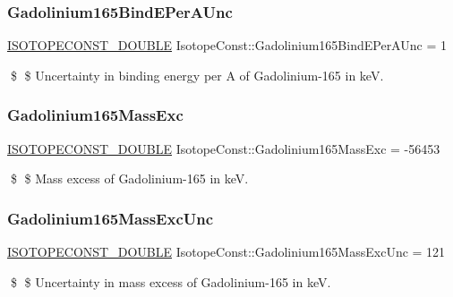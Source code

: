 \subsubsection{\texorpdfstring{Gadolinium165\+Bind\+E\+Per\+A\+Unc}{Gadolinium165BindEPerAUnc}}
{\footnotesize\ttfamily \mbox{\hyperlink{group___isotope_const-_macros_ga8f45a7272ce02c0b4c65c44636ed719a}{I\+S\+O\+T\+O\+P\+E\+C\+O\+N\+S\+T\+\_\+\+D\+O\+U\+B\+LE}} Isotope\+Const\+::\+Gadolinium165\+Bind\+E\+Per\+A\+Unc = 1}

\$ \$ Uncertainty in binding energy per A of Gadolinium-\/165 in keV. \mbox{\label{group___isotope_const-_gadolinium-_gd165_gae990f8d29261ea382b87bca40e54708e}} 
\subsubsection{\texorpdfstring{Gadolinium165\+Mass\+Exc}{Gadolinium165MassExc}}
{\footnotesize\ttfamily \mbox{\hyperlink{group___isotope_const-_macros_ga8f45a7272ce02c0b4c65c44636ed719a}{I\+S\+O\+T\+O\+P\+E\+C\+O\+N\+S\+T\+\_\+\+D\+O\+U\+B\+LE}} Isotope\+Const\+::\+Gadolinium165\+Mass\+Exc = -\/56453}

\$ \$ Mass excess of Gadolinium-\/165 in keV. \mbox{\label{group___isotope_const-_gadolinium-_gd165_ga1b2ff61408b162673a41387fc2b6da99}} 
\subsubsection{\texorpdfstring{Gadolinium165\+Mass\+Exc\+Unc}{Gadolinium165MassExcUnc}}
{\footnotesize\ttfamily \mbox{\hyperlink{group___isotope_const-_macros_ga8f45a7272ce02c0b4c65c44636ed719a}{I\+S\+O\+T\+O\+P\+E\+C\+O\+N\+S\+T\+\_\+\+D\+O\+U\+B\+LE}} Isotope\+Const\+::\+Gadolinium165\+Mass\+Exc\+Unc = 121}

\$ \$ Uncertainty in mass excess of Gadolinium-\/165 in keV. \mbox{\label{group___isotope_const-_gadolinium-_gd165_gaff3554dfe9bef15ac0d1ae5a4dab81d3}} 
